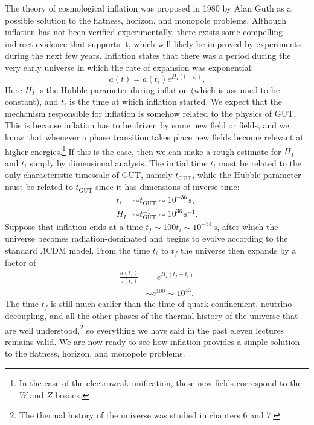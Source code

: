 The theory of cosmological inflation was proposed in 1980 by Alan Guth as a possible solution to the flatness, horizon, and monopole problems. Although inflation has not been verified experimentally, there exists some compelling indirect evidence that supports it, which will likely be improved by experiments during the next few years. Inflation states that there was a period during the very early universe in which the rate of expansion was exponential:
\begin{equation} \label{eq:inflation_scalefactor}
a(t)=a(t_i)e^{H_I(t-t_i)}.
\end{equation}
Here $H_I$ is the Hubble parameter during inflation (which is assumed to be constant), and $t_i$ is the time at which inflation started. We expect that the mechanism responsible for inflation is somehow related to the physics of GUT. This is because inflation has to be driven by some new field or fields, and we know that whenever a phase transition takes place new fields become relevant at higher energies.\footnote{In the case of the electroweak unification, these new fields correspond to the $W$ and $Z$ bosons.} If this is the case, then we can make a rough estimate for $H_I$ and $t_i$ simply by dimensional analysis. The initial time $t_i$ must be related to the only characteristic timescale of GUT, namely $t_{\mathrm{GUT}}$, while the Hubble parameter must be related to $t_{\mathrm{GUT}}^{-1}$ since it has dimensions of inverse time:
\begin{equation}
\begin{split}
t_i&\sim t_{\mathrm{GUT}}\sim 10^{-36}\,{\mathrm{s}},\\
H_I&\sim t_{\mathrm{GUT}}^{-1}\sim 10^{36}\,{\mathrm{s^{-1}}}.
\end{split}
\end{equation}
Suppose that inflation ends at a time $t_f\sim 100t_i\sim 10^{-34}\,\mathrm{s}$, after which the universe becomes radiation-dominated and begins to evolve according to the standard $\Lambda$CDM model. From the time $t_i$ to $t_f$ the universe then expands by a factor of
\begin{equation}
\begin{split}
\frac{a(t_f)}{a(t_i)}&=e^{H_I(t_f-t_i)}\\
&\sim e^{100}\sim 10^{43}.
\end{split}
\end{equation}
The time $t_f$ is still much earlier than the time of quark confinement, neutrino decoupling, and all the other phases of the thermal history of the universe that are well understood,\footnote{The thermal history of the universe was studied in chapters 6 and 7.} so everything we have said in the past eleven lectures remains valid. We are now ready to see how inflation provides a simple solution to the flatness, horizon, and monopole problems.

